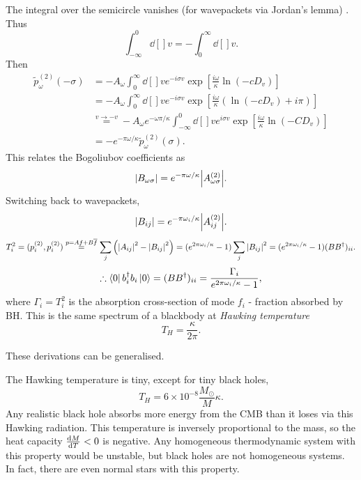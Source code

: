 The integral over the semicircle vanishes (for wavepackets via Jordan's lemma) .
Thus
\begin{equation}
  \int_{-\infty}^0 \dd[]{v} = - \int_0^{\infty} \dd[]{v}.
\end{equation}
Then
\begin{align}
  \widetilde{p}_{\omega}^{(2)}(-\sigma) &= -A_\omega \int_{0}^{\infty}\dd[]{v} e ^{-i \sigma v} \exp[\frac{i \omega}{\kappa} \ln(-c D_v)] \\
					&= -A_\omega \int_{0}^{\infty}\dd[]{v} e ^{-i \sigma v} \exp[\frac{i \omega}{\kappa} (\ln(-c D_v) + i \pi)] \\
					&\stackrel{v \to -v}{=} - A_\omega e^{- \omega \pi / \kappa} \int_{-\infty}^{0}\dd[]{v} e^{i \sigma v} \exp[\frac{i \omega}{\kappa} \ln(-C D_v)] \\
					&= - e^{- \pi \omega / \kappa} \widetilde{p}_{\omega}^{(2)} (\sigma).
\end{align}
This relates the Bogoliubov coefficients as
\begin{equation}
  \abs{B_{\omega\sigma}} = e^{- \pi \omega / \kappa} \abs{A^{(2)}_{\omega\sigma}}.
\end{equation}
Switching back to wavepackets,
\begin{equation}
  \abs{B_{ij}} = e^{- \pi \omega_i / \kappa} \abs{A^{(2)}_{ij}}.
\end{equation}
\begin{equation}
  T_i^{2}= (p_i^{(2)}, p_i^{(2)}) \stackrel{p = Af + B \overline{f}{}}{=} \sum_j \left( \abs{A_{ij}}^2 - \abs{B_{ij}}^2 \right) = (e ^{2 \pi \omega_i / \kappa} - 1) \sum_j \abs{B_{ij}}^2 = (e^{2 \pi \omega_i / \kappa} - 1) (B B^{\dagger})_{ii}.
\end{equation}
\begin{equation}
  \therefore \bra{0} b_i^{\dagger} b_i \ket{0} = (B B^{\dagger})_{ii} = \frac{\Gamma_i}{e^{2 \pi \omega_i / \kappa} - 1}, 
\end{equation}
where $\Gamma_i = T_i^2$ is the absorption cross-section of mode $f_i$ - fraction absorbed by BH.
This is the same spectrum of a blackbody at \emph{Hawking temperature}
\begin{equation}
  T_{H} = \frac{\kappa}{2 \pi}.
\end{equation}
\begin{remark}
  These derivations can be generalised.
\end{remark}
The Hawking temperature is tiny, except for tiny black holes,
\begin{equation}
  T_H = 6 \times 10^{-8} \frac{M_\odot}{M} \kappa.
\end{equation}
Any realistic black hole absorbs more energy from the CMB than it loses via this Hawking radiation.
This temperature is inversely proportional to the mass, so the heat capacity $\dv{M}{T} < 0$ is negative.
Any homogeneous thermodynamic system with this property would be unstable, but black holes are not homogeneous systems. In fact, there are even normal stars with this property.

